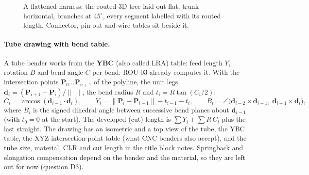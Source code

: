 \begin{figure}[htbp]
\centering
{}
\caption{A flattened harness: the routed 3D tree laid out flat, trunk horizontal, branches at $45^\circ$,
every segment labelled with its routed length. Connector, pin-out and wire tables sit beside it.}
\label{fig:rou-flat}
\end{figure}

\paragraph{Tube drawing with bend table.} A tube bender works from the \textbf{YBC} (also called LRA) table:
feed length $Y$, rotation $B$ and bend angle $C$ per bend. ROU-03 already computes it. With the intersection
points $\mathbf P_0\dots\mathbf P_{n+1}$ of the polyline, the unit legs
$\mathbf d_i=(\mathbf P_{i+1}-\mathbf P_i)/\lVert\cdot\rVert$, the bend radius $R$ and $t_i=R\tan(C_i/2)$:
\[
  C_i=\arccos(\mathbf d_{i-1}\cdot\mathbf d_i),\qquad
  Y_i=\lVert\mathbf P_{i}-\mathbf P_{i-1}\rVert-t_{i-1}-t_i,\qquad
  B_i=\angle\bigl(\mathbf d_{i-2}\times\mathbf d_{i-1},\ \mathbf d_{i-1}\times\mathbf d_i\bigr),
\]
where $B_i$ is the signed dihedral angle between successive bend planes about $\mathbf d_{i-1}$ (with $t_0=0$
at the start). The developed (cut) length is $\sum Y_i+\sum R\,C_i$ plus the last straight. The drawing has an
isometric and a top view of the tube, the YBC table, the XYZ intersection-point table (what CNC benders also
accept), and the tube size, material, CLR and cut length in the title block notes. Springback and elongation
compensation depend on the bender and the material, so they are left out for now (question D3).

